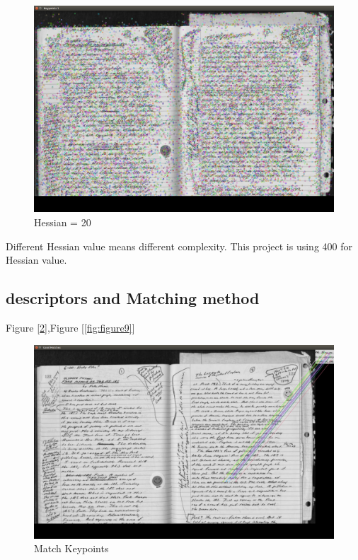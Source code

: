 \documentclass[journal]{IEEEtran}
\begin{document}
		\begin{figure}[h]
			\centering
			\includegraphics[scale=0.15]{Figure/20.png}
			\caption{Hessian = 20}
			\label{fig:figure7}
		\end{figure} 
		
Different Hessian value means different complexity. This project is using 400 for Hessian value. 
\subsection{descriptors and Matching method}
Figure [\ref{fig:figure8}],Figure [\ref{fig:figure9}]
		\begin{figure}[h]
			\centering
			\includegraphics[scale=0.15]{Figure/FLANN.jpg}
			\caption{Match Keypoints}
			\label{fig:figure8}
			\end{figure} 
			
\end{document}

